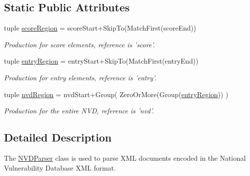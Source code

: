 \subsection*{Static Public Attributes}
\begin{DoxyCompactItemize}
\item 
\hypertarget{classxutools_1_1parsers_1_1_n_v_d_parser_abb2e6794884ed87a82c2ee07528f310d}{tuple \hyperlink{classxutools_1_1parsers_1_1_n_v_d_parser_abb2e6794884ed87a82c2ee07528f310d}{score\-Region} = score\-Start+Skip\-To(Match\-First(score\-End))}\label{classxutools_1_1parsers_1_1_n_v_d_parser_abb2e6794884ed87a82c2ee07528f310d}

\begin{DoxyCompactList}\small\item\em Production for score elements, reference is 'score'. \end{DoxyCompactList}\item 
\hypertarget{classxutools_1_1parsers_1_1_n_v_d_parser_aa55aadcd440a19f90d248e80e4782b0e}{tuple \hyperlink{classxutools_1_1parsers_1_1_n_v_d_parser_aa55aadcd440a19f90d248e80e4782b0e}{entry\-Region} = entry\-Start+Skip\-To(Match\-First(entry\-End))}\label{classxutools_1_1parsers_1_1_n_v_d_parser_aa55aadcd440a19f90d248e80e4782b0e}

\begin{DoxyCompactList}\small\item\em Production for entry elements, reference is 'entry'. \end{DoxyCompactList}\item 
\hypertarget{classxutools_1_1parsers_1_1_n_v_d_parser_af2a1dabb72610c8ff955736b88bd139d}{tuple \hyperlink{classxutools_1_1parsers_1_1_n_v_d_parser_af2a1dabb72610c8ff955736b88bd139d}{nvd\-Region} = nvd\-Start+Group( Zero\-Or\-More(Group(\hyperlink{classxutools_1_1parsers_1_1_n_v_d_parser_aa55aadcd440a19f90d248e80e4782b0e}{entry\-Region})) )}\label{classxutools_1_1parsers_1_1_n_v_d_parser_af2a1dabb72610c8ff955736b88bd139d}

\begin{DoxyCompactList}\small\item\em Production for the entire N\-V\-D, reference is 'nvd'. \end{DoxyCompactList}\end{DoxyCompactItemize}


\subsection{Detailed Description}
The \hyperlink{classxutools_1_1parsers_1_1_n_v_d_parser}{N\-V\-D\-Parser} class is used to parse X\-M\-L documents encoded in the National Vulnerability Database X\-M\-L format. 

